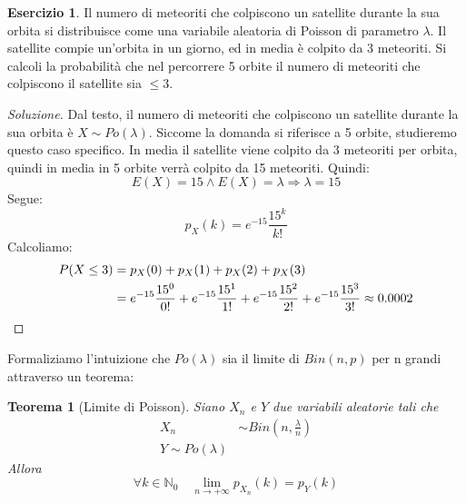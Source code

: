 \documentclass{article}
\theoremstyle{plain}
\newtheorem{teorema}{Teorema}[section]
\theoremstyle{definition}
\newtheorem{esercizio}{Esercizio}[section]
\theoremstyle{remark}
\newenvironment{soluzione}
	{\renewcommand\qedsymbol{$\mathwitch*$}\begin{proof}[Soluzione]}
	{\end{proof}}
\renewcommand{\qedsymbol}{$\mathrightghost$}
\begin{document}
\begin{esercizio}
	Il numero di meteoriti che colpiscono un satellite durante la sua orbita si distribuisce come una variabile aleatoria di Poisson di parametro $\lambda$. Il satellite compie un'orbita in un giorno, ed in media è colpito da 3 meteoriti. Si calcoli la probabilità che nel percorrere 5 orbite il numero di meteoriti che colpiscono il satellite sia $\leq3$.
	\begin{soluzione}
		Dal testo, il numero di meteoriti che colpiscono un satellite durante la sua orbita è $X\sim Po(\lambda)$. Siccome la domanda si riferisce a 5 orbite, studieremo questo caso specifico. In media il satellite viene colpito da 3 meteoriti per orbita, quindi in media in 5 orbite verrà colpito da 15 meteoriti. Quindi:
		\begin{equation*}
			E(X)=15\wedge E(X)=\lambda\Rightarrow \lambda=15
		\end{equation*}
		Segue:
		\begin{equation*}
			p_X(k)=e^{-15}\frac{15^k}{k!}
		\end{equation*}
		Calcoliamo:
		\begin{align*}
			P(X\leq3)&=p_X(0)+p_X(1)+p_X(2)+p_X(3)\\
			&=e^{-15}\frac{15^0}{0!}+e^{-15}\frac{15^1}{1!}+e^{-15}\frac{15^2}{2!}+e^{-15}\frac{15^3}{3!}\approx 0.0002\qedhere
		\end{align*}
	\end{soluzione}
\end{esercizio}
Formaliziamo l'intuizione che $Po(\lambda)$ sia il limite di $Bin(n,p)$ per n grandi attraverso un teorema:
\begin{teorema}[Limite di Poisson]
	Siano $X_n$ e $Y$ due variabili aleatorie tali che
	\begin{align*}
		X_n&\sim Bin\left(n, \frac{\lambda}{n}\right)\\
		Y\sim Po(\lambda)
	\end{align*}
	Allora
	\begin{equation*}
		\forall k\in\mathds{N}_0\quad \lim_{n\to+\infty}p_{X_n}(k)=p_Y(k)
	\end{equation*}
\end{teorema}
\end{document}
